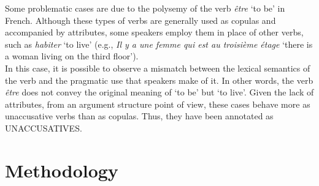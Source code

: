 Some problematic cases are due to the polysemy of the verb \textit{être} `to be' in French. Although these types of verbs are generally used as copulas and accompanied by attributes, some speakers employ them in place of other verbs, such as \textit{habiter} `to live' (e.g., 
\textit{Il y a une femme qui est au troisième étage} `there is a woman living on the third floor').\\
In this case, it is possible to observe a mismatch between the lexical semantics of the verb and the pragmatic use that speakers make of it. In other words, the verb \textit{être} does not convey the original meaning of `to be' but `to live'. Given the lack of attributes, from an argument structure point of view, these cases behave more as unaccusative verbs than as copulas. Thus, they have been annotated as {\selectfont UNACCUSATIVES}.


\section{Methodology}

